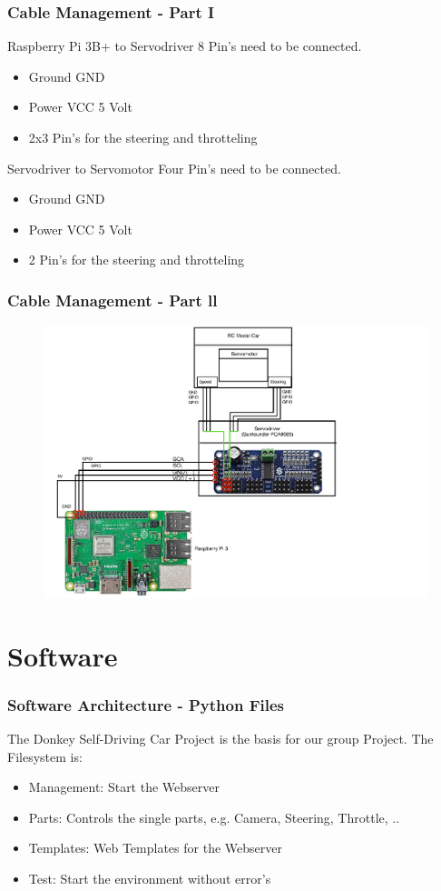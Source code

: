 \documentclass{beamer}
\begin{document}
%
%
\begin{frame}
\frametitle{Cable Management - Part I}
\begin{block}{Raspberry Pi 3B+ to Servodriver}
8 Pin's need to be connected. 
\begin{itemize}
\item Ground GND
\item Power VCC 5 Volt
\item 2x3 Pin's for the steering and throtteling
\end{itemize}
\end{block}
\begin{block}{Servodriver to Servomotor}
Four Pin's need to be connected. 
\begin{itemize}
\item Ground GND
\item Power VCC 5 Volt
\item 2 Pin's for the steering and throtteling
\end{itemize}
\end{block}
\end{frame}
%
%
\begin{frame}
\frametitle{Cable Management - Part ll}
\begin{figure}
\includegraphics[width=0.7\linewidth]{photo/ebene2.pdf}
\end{figure}
\end{frame}
%
\section{Software}
%
\begin{frame}
\frametitle{Software Architecture - Python Files}
The Donkey Self-Driving Car Project is the basis for our group Project. The Filesystem is: \\
\begin{itemize}
\item Management: Start the Webserver
\item Parts: Controls the single parts, e.g. Camera, Steering, Throttle, ..
\item Templates: Web Templates for the Webserver
\item Test: Start the environment without error's
\end{itemize}
\end{frame}
\end{document}
